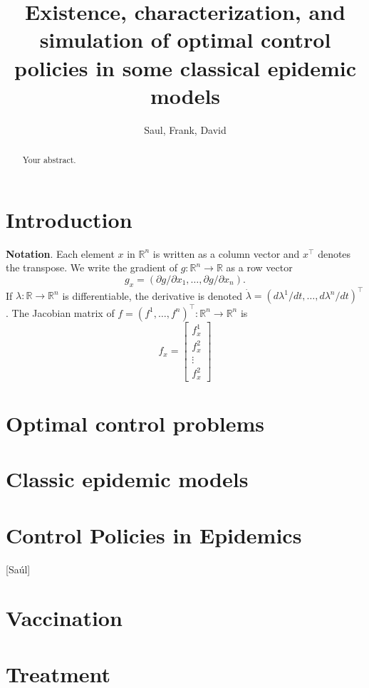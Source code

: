 \documentclass[a4paper]{amsart}
\title[%
	Existence, characterization and simulation of OCP for some epidemic 
	Models%
	]{
	Existence, characterization, and simulation
	of optimal control policies in some classical epidemic models
}
\author{Saul, Frank, David}
\newcommand{\R}{\mathbb{R}}
\begin{document}
	\maketitle
\maketitle

\begin{abstract}
	Your abstract.
\end{abstract}

\section{Introduction}

{\bf Notation}. Each element $x$ in $\R^n$ is written as a column vector and $x^\top$ denotes the transpose. We write the gradient of $g:\R^n\to\R$ as a row vector 
    \[ g_x =(\partial g/\partial x_1,\ldots, \partial g/\partial x_n). \]
If $\lambda:\R\to\R^n$ is differentiable, the derivative is denoted $\dot{\lambda}=(d\lambda^1/dt,\ldots,d\lambda^n/dt)^\top$. The Jacobian matrix of $f=(f^1,\ldots,f^n)^\top:\R^n\to\R^n$ is   
\[f_x=\begin{bmatrix}
f^1_x\\
f^2_x\\
\vdots \\
f^2_x
\end{bmatrix}\]

  \section{Optimal control problems}
    
  \section{Classic epidemic models}
  \section{Control Policies in Epidemics}
  [Saúl]
      
      \section{Vaccination}
        
      \section{Treatment}
        
\end{document}
